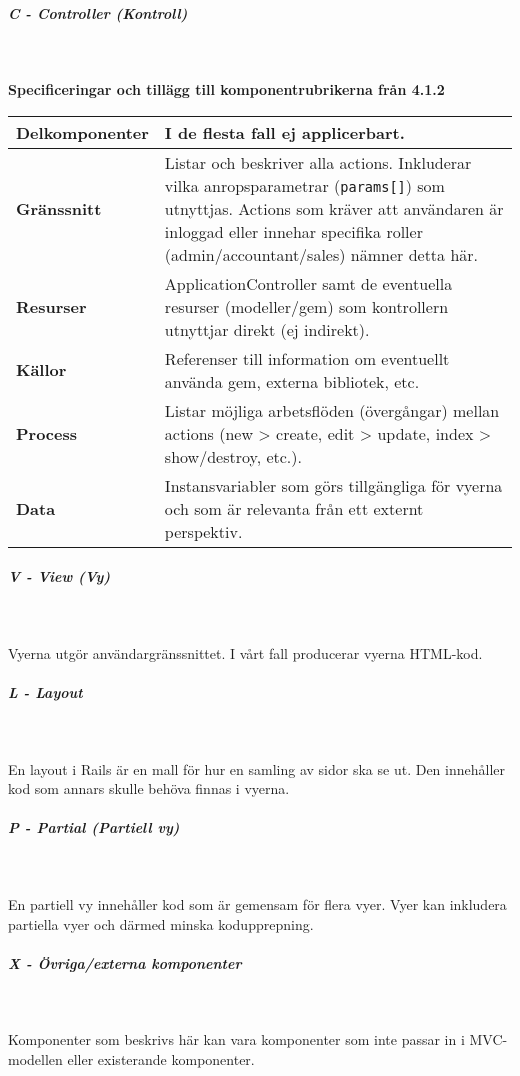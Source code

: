 \documentclass[a4paper, twoside, 11pt, titlepage]{article}
\begin{document}
			\subparagraph{\emph{C - Controller (\emph{Kontroll})}}\

				\textbf{Specificeringar och tillägg till komponentrubrikerna från 4.1.2}

				\begin {table} [ht] \begin{tabular} { p{2.6cm} p{12.5cm} }
					\hline
					{\sffamily\textbf{Delkomponenter}} & {I de flesta fall ej applicerbart.} \\
					\hline
					{\sffamily\textbf{Gränssnitt}} & {Listar och beskriver alla actions. Inkluderar vilka anropsparametrar ({\tt params[]}) som utnyttjas. Actions som kräver att användaren är inloggad eller innehar specifika roller (admin/accountant/sales) nämner detta här.} \\
					\hline
					{\sffamily\textbf{Resurser}} & {ApplicationController samt de eventuella resurser (modeller/gem) som kontrollern utnyttjar direkt (ej indirekt).} \\
					\hline
					{\sffamily\textbf{Källor}} & {Referenser till information om eventuellt använda gem, externa bibliotek, etc.} \\
					\hline
					{\sffamily\textbf{Process}} & {Listar möjliga arbetsflöden (övergångar) mellan actions (new > create, edit > update, index > show/destroy, etc.).} \\
					\hline
					{\sffamily\textbf{Data}} & {Instansvariabler som görs tillgängliga för vyerna och som är relevanta från ett externt perspektiv.} \\
					\hline
				\end{tabular} \end{table} \FloatBarrier


			\subparagraph{\emph{V - View (\emph{Vy})}}\

				Vyerna utgör användargränssnittet. I vårt fall producerar vyerna HTML-kod.

			\subparagraph{\emph{L - Layout}}\

				En layout i Rails är en mall för hur en samling av sidor ska se ut. Den innehåller kod som annars skulle behöva finnas i vyerna.

			\subparagraph{\emph{P - Partial (\emph{Partiell vy})}}\

				En partiell vy innehåller kod som är gemensam för flera vyer. Vyer kan inkludera partiella vyer och därmed minska kodupprepning.

			\subparagraph{\emph{X - Övriga/externa komponenter}}\

				Komponenter som beskrivs här kan vara komponenter som inte passar in i MVC-modellen eller existerande komponenter.
\end{document}
